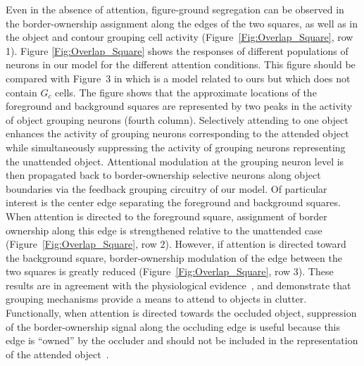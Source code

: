 Even in the absence of attention, figure-ground segregation can be
observed in the border-ownership assignment along the edges of the two
squares, as well as in the object and contour grouping cell activity
(Figure~\ref{Fig:Overlap_Square}, row 1).  Figure
\ref{Fig:Overlap_Square} shows the responses of different populations
of neurons in our model for the different attention conditions. This
figure should be compared with Figure~3 in
\cite{Mihalas_etal11b} which is a model related to ours but which does
not contain $G_c$ cells. The figure shows that the approximate locations of the
foreground and background squares are represented by two peaks in the
activity of object grouping neurons (fourth column). Selectively
attending to one object enhances the activity of grouping neurons
corresponding to the attended object while simultaneously suppressing
the activity of grouping neurons representing the unattended
object. Attentional modulation at the grouping neuron level is then
propagated back to border-ownership selective neurons along object
boundaries via the feedback grouping circuitry of our model.  Of
particular interest is the center edge separating the foreground and
background squares. When attention is directed to the foreground
square, assignment of border ownership along this edge is strengthened
relative to the unattended case (Figure~\ref{Fig:Overlap_Square}, row
2).  However, if attention is directed toward the background square,
border-ownership modulation of the edge between the two squares is
greatly reduced (Figure~\ref{Fig:Overlap_Square}, row 3).  These
results are in agreement with the physiological
evidence~\citep{Qiu_etal07}, and demonstrate that grouping mechanisms
provide a means to attend to objects in clutter.  Functionally, when
attention is directed towards the occluded object, suppression of the
border-ownership signal along the occluding edge is useful because
this edge is ``owned'' by the occluder and should not be included in
the representation of the attended object~\citep{Craft_etal07}.




\clearpage



